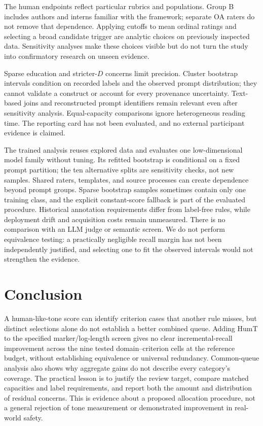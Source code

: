 \documentclass[manuscript,screen,review,anonymous]{acmart}
\begin{document}
The human endpoints reflect particular rubrics and populations. Group B includes authors and interns familiar with the framework; separate OA raters do not remove that dependence. Applying cutoffs to mean ordinal ratings and selecting a broad candidate trigger are analytic choices on previously inspected data. Sensitivity analyses make these choices visible but do not turn the study into confirmatory research on unseen evidence.

Sparse education and stricter-$D$ concerns limit precision. Cluster bootstrap intervals condition on recorded labels and the observed prompt distribution; they cannot validate a construct or account for every provenance uncertainty. Text-based joins and reconstructed prompt identifiers remain relevant even after sensitivity analysis. Equal-capacity comparisons ignore heterogeneous reading time. The reporting card has not been evaluated, and no external participant evidence is claimed.

The trained analysis reuses explored data and evaluates one low-dimensional model family without tuning. Its refitted bootstrap is conditional on a fixed prompt partition; the ten alternative splits are sensitivity checks, not new samples. Shared raters, templates, and source processes can create dependence beyond prompt groups. Sparse bootstrap samples sometimes contain only one training class, and the explicit constant-score fallback is part of the evaluated procedure. Historical annotation requirements differ from label-free rules, while deployment drift and acquisition costs remain unmeasured. There is no comparison with an LLM judge or semantic screen. We do not perform equivalence testing: a practically negligible recall margin has not been independently justified, and selecting one to fit the observed intervals would not strengthen the evidence.

\section{Conclusion}
A human-like-tone score can identify criterion cases that another rule misses, but distinct selections alone do not establish a better combined queue. Adding HumT to the specified marker/log-length screen gives no clear incremental-recall improvement across the nine tested domain--criterion cells at the reference budget, without establishing equivalence or universal redundancy. Common-queue analysis also shows why aggregate gains do not describe every category's coverage. The practical lesson is to justify the review target, compare matched capacities and label requirements, and report both the amount and distribution of residual concerns. This is evidence about a proposed allocation procedure, not a general rejection of tone measurement or demonstrated improvement in real-world safety.
\end{document}
